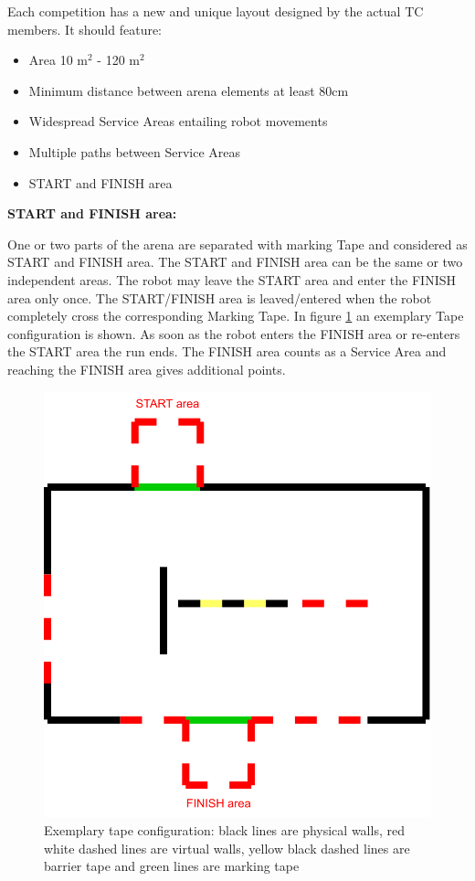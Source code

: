Each competition has a new and unique layout designed by the actual TC members.
It should feature:
\begin{itemize}
\item Area 10 m$^2$ - 120 m$^2$
\item Minimum distance between arena elements at least $80\si{\centi\meter}$ 
\item Widespread Service Areas entailing robot movements
\item Multiple paths between Service Areas
\item START and FINISH area
\end{itemize}


\textbf{START and FINISH area:}
\label{subsubsec: Start and Goal Area}

One or two parts of the arena are separated with marking Tape and considered as START and FINISH area. The START and FINISH area can be the same or two independent areas. The robot may leave the START area and enter the FINISH area only once. The START/FINISH area is leaved/entered when the robot completely cross the corresponding Marking Tape. In figure \ref{fig:tapeconfig} an exemplary Tape configuration is shown. As soon as the robot enters the FINISH area or re-enters the START area the run ends. The FINISH area counts as a Service Area and reaching the FINISH area gives additional points. 

\begin{figure} [h!]
	\begin{center}
		\includegraphics[width= 0.6\linewidth]{./images/arena/tabes.pdf}
	\end{center}
	\caption{Exemplary tape configuration: black lines are physical walls, red white dashed lines are virtual walls, yellow black dashed lines are barrier tape and green lines are marking tape}
	\label{fig:tapeconfig}
\end{figure}

